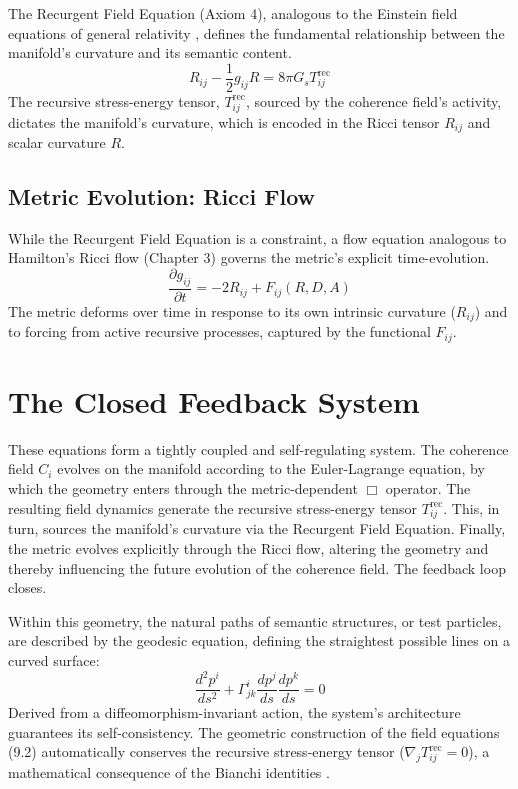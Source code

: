 The Recurgent Field Equation (Axiom 4), analogous to the Einstein field equations of general relativity \autocite{Einstein1915}, defines the fundamental relationship between the manifold's curvature and its semantic content.
\begin{equation}
R_{ij} - \frac{1}{2}g_{ij}R = 8\pi G_s T^{\text{rec}}_{ij}
\end{equation}
The recursive stress-energy tensor, \(T^{\text{rec}}_{ij}\), sourced by the coherence field's activity, dictates the manifold's curvature, which is encoded in the Ricci tensor \(R_{ij}\) and scalar curvature \(R\).

\subsection{Metric Evolution: Ricci Flow}

While the Recurgent Field Equation is a constraint, a flow equation analogous to Hamilton's Ricci flow (Chapter 3) \autocite{Hamilton1982} governs the metric's explicit time-evolution.
\begin{equation}
\frac{\partial g_{ij}}{\partial t} = -2 R_{ij} + F_{ij}(R, D, A)
\end{equation}
The metric deforms over time in response to its own intrinsic curvature (\(R_{ij}\)) and to forcing from active recursive processes, captured by the functional \(F_{ij}\).

\section{The Closed Feedback System}

These equations form a tightly coupled and self-regulating system. The coherence field \(C_i\) evolves on the manifold according to the Euler-Lagrange equation, by which the geometry enters through the metric-dependent \(\Box\) operator. The resulting field dynamics generate the recursive stress-energy tensor \(T^{\text{rec}}_{ij}\). This, in turn, sources the manifold's curvature via the Recurgent Field Equation. Finally, the metric evolves explicitly through the Ricci flow, altering the geometry and thereby influencing the future evolution of the coherence field. The feedback loop closes.

Within this geometry, the natural paths of semantic structures, or test particles, are described by the geodesic equation, defining the straightest possible lines on a curved surface:
\begin{equation}
\frac{d^2 p^i}{ds^2} + \Gamma^i_{jk} \frac{dp^j}{ds} \frac{dp^k}{ds} = 0
\end{equation}
Derived from a diffeomorphism-invariant action, the system's architecture guarantees its self-consistency. The geometric construction of the field equations (9.2) automatically conserves the recursive stress-energy tensor ($\nabla_j T^{\text{rec}}_{ij} = 0$), a mathematical consequence of the Bianchi identities \autocite{Bianchi1902}. 